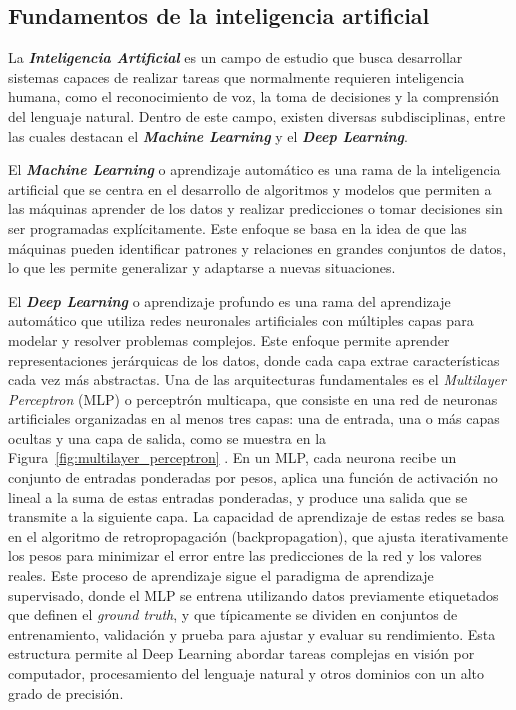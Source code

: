 \documentclass[11pt,spanish,listoffigures,listoftables]{tfgetsinf}
\begin{document}
\subsection{Fundamentos de la inteligencia artificial}
La \textit{\textbf{Inteligencia Artificial}} es un campo de estudio que busca desarrollar sistemas capaces de realizar tareas que normalmente requieren inteligencia humana, como el reconocimiento de voz, la toma de decisiones y la comprensión del lenguaje natural. Dentro de este campo, existen diversas subdisciplinas, entre las cuales destacan el \textit{\textbf{Machine Learning}} y el \textit{\textbf{Deep Learning}}.

El \textit{\textbf{Machine Learning}} o aprendizaje automático es una rama de la inteligencia artificial que se centra en el desarrollo de algoritmos y modelos que permiten a las máquinas aprender de los datos y realizar predicciones o tomar decisiones sin ser programadas explícitamente. Este enfoque se basa en la idea de que las máquinas pueden identificar patrones y relaciones en grandes conjuntos de datos, lo que les permite generalizar y adaptarse a nuevas situaciones.

El \textit{\textbf{Deep Learning}} o aprendizaje profundo es una rama del aprendizaje automático que utiliza redes neuronales artificiales con múltiples capas para modelar y resolver problemas complejos. Este enfoque permite aprender representaciones jerárquicas de los datos, donde cada capa extrae características cada vez más abstractas. Una de las arquitecturas fundamentales es el \textit{Multilayer Perceptron} (MLP) o perceptrón multicapa, que consiste en una red de neuronas artificiales organizadas en al menos tres capas: una de entrada, una o más capas ocultas y una capa de salida, como se muestra en la Figura~\ref{fig:multilayer_perceptron} \cite{khan2018guide}. En un MLP, cada neurona recibe un conjunto de entradas ponderadas por pesos, aplica una función de activación no lineal a la suma de estas entradas ponderadas, y produce una salida que se transmite a la siguiente capa. La capacidad de aprendizaje de estas redes se basa en el algoritmo de retropropagación (backpropagation), que ajusta iterativamente los pesos para minimizar el error entre las predicciones de la red y los valores reales. Este proceso de aprendizaje sigue el paradigma de aprendizaje supervisado, donde el MLP se entrena utilizando datos previamente etiquetados que definen el \textit{ground truth}, y que típicamente se dividen en conjuntos de entrenamiento, validación y prueba para ajustar y evaluar su rendimiento. Esta estructura permite al Deep Learning abordar tareas complejas en visión por computador, procesamiento del lenguaje natural y otros dominios con un alto grado de precisión.
\end{document}

